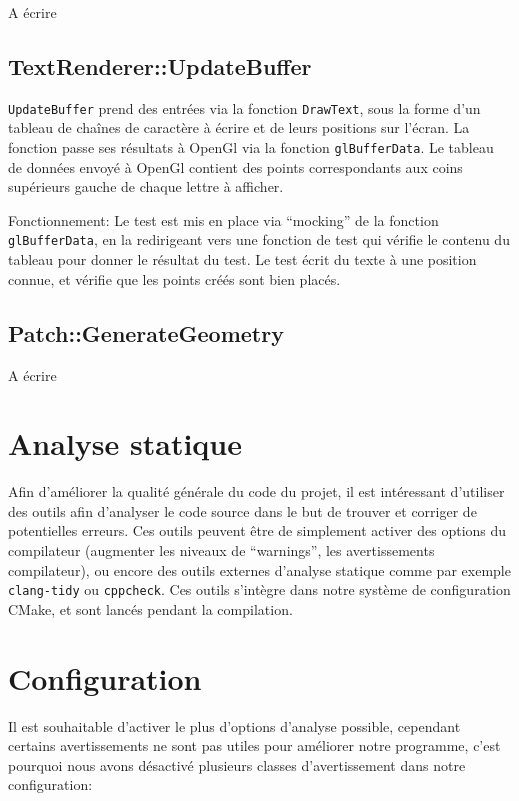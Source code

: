 A écrire

\subsection{TextRenderer::UpdateBuffer}\label{textrendererupdatebuffer}

\texttt{UpdateBuffer} prend des entrées via la fonction
\texttt{DrawText}, sous la forme d'un tableau de chaînes de caractère à
écrire et de leurs positions sur l'écran. La fonction passe ses
résultats à OpenGl via la fonction \texttt{glBufferData}. Le tableau de
données envoyé à OpenGl contient des points correspondants aux coins
supérieurs gauche de chaque lettre à afficher.

Fonctionnement: Le test est mis en place via ``mocking'' de la fonction
\texttt{glBufferData}, en la redirigeant vers une fonction de test qui vérifie le
contenu du tableau pour donner le résultat du test. Le test écrit du
texte à une position connue, et vérifie que les points créés sont bien
placés.

\subsection{Patch::GenerateGeometry}\label{patchgenerategeometry}

A écrire

\newpage
\section{Analyse statique}\label{sec:sanal}

Afin d'améliorer la qualité générale du code du projet, il est
intéressant d'utiliser des outils afin d'analyser le code source dans le
but de trouver et corriger de potentielles erreurs. Ces outils peuvent
être de simplement activer des options du compilateur (augmenter les
niveaux de ``warnings'', les avertissements compilateur), ou encore des
outils externes d'analyse statique comme par exemple \texttt{clang-tidy}
ou \texttt{cppcheck}. Ces outils s'intègre dans notre système de
configuration CMake, et sont lancés pendant la compilation.

\section{Configuration}\label{configuration}

Il est souhaitable d'activer le plus d'options d'analyse possible,
cependant certains avertissements ne sont pas utiles pour améliorer
notre programme, c'est pourquoi nous avons désactivé plusieurs classes
d'avertissement dans notre configuration:

